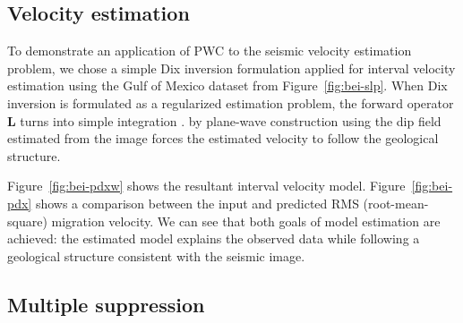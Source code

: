 \subsection{Velocity estimation}




To demonstrate an application of PWC to the seismic velocity
estimation problem, we chose a simple Dix inversion formulation
\cite[]{GEO20-01-00680086} applied for interval velocity estimation
using the Gulf of Mexico dataset from Figure~\ref{fig:bei-slp}. When
Dix inversion is formulated as a regularized estimation problem, the
forward operator $\mathbf{L}$  turns into simple integration
\cite[]{Clapp.sep.97.bob1,alejandro}. 
 by plane-wave construction using the dip field
estimated from the image forces the estimated velocity to follow the
geological structure.

Figure~\ref{fig:bei-pdxw} shows the resultant interval velocity model.
Figure~\ref{fig:bei-pdx} shows a comparison between the input and
predicted RMS (root-mean-square) migration velocity.  We can see that
both goals of model estimation are achieved: the estimated model
explains the observed data while following a geological structure
consistent with the seismic image.

\subsection{Multiple suppression}

